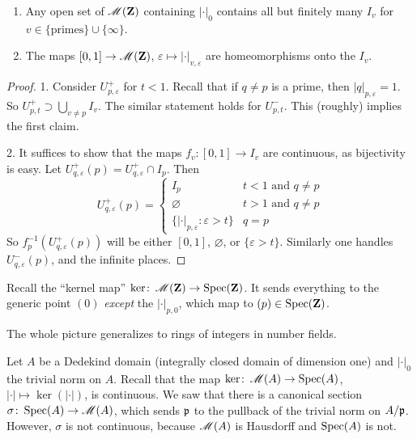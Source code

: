\begin{proposition}
\leavevmode
\begin{enumerate}
\item
Any open set of $\operatorname{\mathscr{M}}(\mathbf{Z})$ containing $|\cdot|_0$ contains all but 
finitely many $I_v$ for $v\in \{\text{primes}\}\cup\{\infty\}$. 

\item
The maps $[0,1]\to \operatorname{\mathscr{M}}(\mathbf{Z})$, $\varepsilon\mapsto |\cdot|_{v,\varepsilon}$ 
are homeomorphisms onto the $I_v$. 
\end{enumerate}
\end{proposition}
\begin{proof}
1. Consider $U_{p,\varepsilon}^+$ for $t<1$. Recall that if $q\ne p$ is a prime, 
then $|q|_{p,\varepsilon}=1$. So $U_{p,t}^+\supset \bigcup_{v\ne p} I_v$. The 
similar statement holds for $U_{p,t}^-$. This (roughly) implies the first 
claim. 

2. It suffices to show that the maps $f_v\colon [0,1]\to I_v$ are continuous, as 
bijectivity is easy. Let $U_{q,\varepsilon}^+(p)=U_{q,\varepsilon}^+\cap I_p$. 
Then 
\[
  U_{q,\varepsilon}^+(p) = \begin{cases} I_p & t<1\text{ and }q\ne p \\ \varnothing & t>1\text{ and }q\ne p \\ \{|\cdot|_{p,\varepsilon}\colon \varepsilon>t\} & q=p \end{cases}
\]
So $f_p^{-1}(U_{q,\varepsilon}^+(p))$ will be either $[0,1]$, $\varnothing$, or 
$\{\varepsilon>t\}$. Similarly one handles $U_{q,\varepsilon}^-(p)$, and the 
infinite places. 
\end{proof}

Recall the ``kernel map'' $\ker\colon \operatorname{\mathscr{M}}(\mathbf{Z})\to \operatorname{Spec}(\mathbf{Z})$. It sends 
everything to the generic point $(0)$ \emph{except} the $|\cdot|_{p,0}$, which 
map to $(p)\in \operatorname{Spec}(\mathbf{Z})$. 

The whole picture generalizes to rings of integers in number fields. 

Let $A$ be a Dedekind domain (integrally closed domain of dimension one) and 
$|\cdot|_0$ the trivial norm on $A$. Recall that the map 
$\ker\colon \operatorname{\mathscr{M}}(A)\to \operatorname{Spec}(A)$, $|\cdot|\mapsto \ker(|\cdot|)$, is 
continuous. We saw that there is a canonical section 
$\sigma\colon \operatorname{Spec}(A)\to \operatorname{\mathscr{M}}(A)$, which sends $\mathfrak{p}$ to the pullback of 
the trivial norm on $A/\mathfrak{p}$. However, $\sigma$ is not continuous, because 
$\operatorname{\mathscr{M}}(A)$ is Hausdorff and $\operatorname{Spec}(A)$ is not. 





